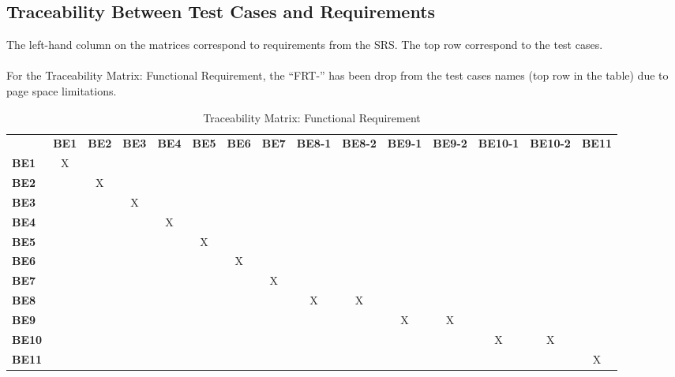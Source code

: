 \documentclass[12pt, titlepage]{article}
\begin{document}
\newpage
\begin{landscape}
\subsection{Traceability Between Test Cases and Requirements}
\noindent The left-hand column on the matrices correspond to requirements from the SRS. The top row correspond to the test cases.\\\\
\noindent For the Traceability Matrix: Functional Requirement, the ``FRT-'' has been drop from the test cases names (top row in the table) due to page space limitations.
\begin{table}[H]
    \centering
    \caption{Traceability Matrix: Functional Requirement}
    \begin{tabular}{lcccccccccccccc}
        ~ & \textbf{BE1} & \textbf{BE2} & \textbf{BE3} & \textbf{BE4} & \textbf{BE5} & \textbf{BE6} & \textbf{BE7} & \textbf{BE8-1} & \textbf{BE8-2} & \textbf{BE9-1} & \textbf{BE9-2} & \textbf{BE10-1} & \textbf{BE10-2} & \textbf{BE11}\\
        \textbf{BE1}    & X & ~ & ~ & ~ & ~ & ~ & ~ & ~ & ~ & ~ & ~ & ~ & ~ & ~\\
        \textbf{BE2}    & ~ & X & ~ & ~ & ~ & ~ & ~ & ~ & ~ & ~ & ~ & ~ & ~ & ~\\
        \textbf{BE3}    & ~ & ~ & X & ~ & ~ & ~ & ~ & ~ & ~ & ~ & ~ & ~ & ~ & ~\\
        \textbf{BE4}    & ~ & ~ & ~ & X & ~ & ~ & ~ & ~ & ~ & ~ & ~ & ~ & ~ & ~\\
        \textbf{BE5}    & ~ & ~ & ~ & ~ & X & ~ & ~ & ~ & ~ & ~ & ~ & ~ & ~ & ~\\
        \textbf{BE6}    & ~ & ~ & ~ & ~ & ~ & X & ~ & ~ & ~ & ~ & ~ & ~ & ~ & ~\\
        \textbf{BE7}    & ~ & ~ & ~ & ~ & ~ & ~ & X & ~ & ~ & ~ & ~ & ~ & ~ & ~\\
        \textbf{BE8}    & ~ & ~ & ~ & ~ & ~ & ~ & ~ & X & X & ~ & ~ & ~ & ~ & ~\\
        \textbf{BE9}    & ~ & ~ & ~ & ~ & ~ & ~ & ~ & ~ & ~ & X & X & ~ & ~ & ~\\
        \textbf{BE10}   & ~ & ~ & ~ & ~ & ~ & ~ & ~ & ~ & ~ & ~ & ~ & X & X & ~\\
        \textbf{BE11}   & ~ & ~ & ~ & ~ & ~ & ~ & ~ & ~ & ~ & ~ & ~ & ~ & ~ & X\\
    \end{tabular}
    \label{Traceability Matrix: Functional Requirement}
\end{table}


\end{landscape}
\end{document}
